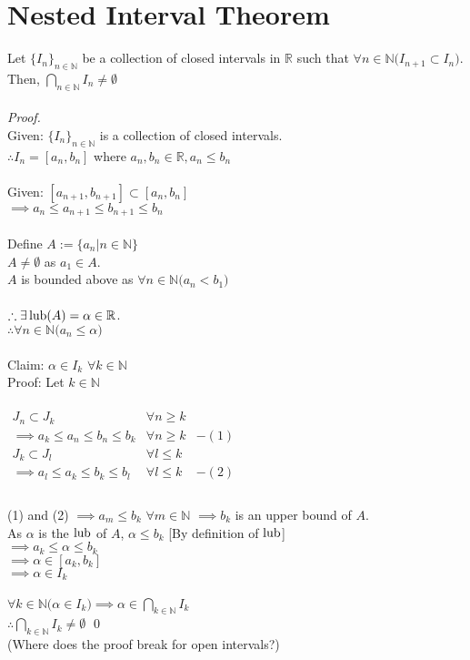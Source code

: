 \section{Nested Interval Theorem}\label{sec:nestedint}
Let $\{I_n\}_{n\in\mathbb{N}}$ be a collection of closed intervals in $\mathbb{R}$ such that $\forall n\in\mathbb{N}\big(I_{n+1}\subset I_n\big)$.\\
Then, $\displaystyle\bigcap_{n\in\mathbb{N}}I_n\neq\emptyset$\\~\\
\textit{Proof.}\\
Given: $\{I_n\}_{n\in\mathbb{N}}$ is a collection of closed intervals.\\
$\therefore I_n = [a_n, b_n]$ where $a_n, b_n\in\mathbb{R}, a_n\le b_n$\\~\\
Given: $[a_{n+1}, b_{n+1}]\subset[a_n, b_n]$\\
$\implies a_n \le a_{n+1} \le b_{n+1} \le b_n$\\~\\
Define $A:= \{a_n|n\in\mathbb{N}\}$\\
$A\neq\emptyset$ as $a_1\in A$.\\
$A$ is bounded above as $\forall n \in \mathbb{N}\big(a_n < b_1\big)$\\~\\
$\therefore \exists \operatorname{lub}(A) = \alpha \in \mathbb{R}$.\\
$\therefore \forall n \in \mathbb{N}\big(a_n \le \alpha\big)$\\~\\
Claim: $\alpha \in I_k$ $\forall k\in \mathbb{N}$\\
Proof: Let $k\in\mathbb{N}$\\~\\
\(\begin{array}{lrr}
J_n \subset J_k &\forall n \ge k &\\
\implies a_k \le a_n \le b_n \le b_k &\forall n\ge k &-(1)\\
J_k \subset J_l & \forall l \le k&\\
\implies a_l \le a_k \le b_k \le b_l &\forall l\le k &-(2)\\
\end{array}\)\\~\\
(1) and (2) $\implies a_m \le b_k$ $\forall m \in \mathbb{N}$
$\implies b_k$ is an upper bound of $A$.\\
As $\alpha$ is the $\operatorname{lub}$ of $A$, $\alpha \le b_k$ \hfill [By definition of $\operatorname{lub}$]\\
$\implies a_k \le \alpha  \le b_k$\\
$\implies \alpha \in [a_k, b_k]$\\
$\implies \alpha \in I_k$\\~\\
$\forall k \in \mathbb{N}\big(\alpha \in I_k\big) \implies \alpha \in \displaystyle\bigcap_{k\in\mathbb{N}}I_k$\\
$\therefore \displaystyle\bigcap_{k\in\mathbb{N}}I_k \neq \emptyset$ \hfill \qed\\
(Where does the proof break for open intervals?)
